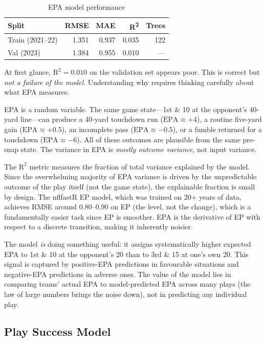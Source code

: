 \documentclass[11pt]{article}
\begin{document}
\begin{table}[H]
\centering
\caption{EPA model performance}
\begin{tabular}{lrrrr}
\toprule
Split & RMSE & MAE & R\textsuperscript{2} & Trees \\
\midrule
Train (2021--22) & 1.351 & 0.937 & 0.035 & 122 \\
Val (2023) & 1.384 & 0.955 & 0.010 & --- \\
\bottomrule
\end{tabular}
\end{table}

At first glance, $\text{R}^2 = 0.010$ on the validation set appears poor.
This is correct but \emph{not a failure of the model}. Understanding why
requires thinking carefully about what EPA measures.

EPA is a random variable. The same game state---1st \& 10 at the opponent's
40-yard line---can produce a 40-yard touchdown run ($\text{EPA} \approx +4$),
a routine five-yard gain ($\text{EPA} \approx +0.5$), an incomplete pass
($\text{EPA} \approx -0.5$), or a fumble returned for a touchdown
($\text{EPA} \approx -6$). All of these outcomes are plausible from the
same pre-snap state. The variance in EPA is \emph{mostly outcome variance},
not input variance.

The $\text{R}^2$ metric measures the fraction of total variance explained
by the model. Since the overwhelming majority of EPA variance is driven by
the unpredictable outcome of the play itself (not the game state), the
explainable fraction is small by design. The nflfastR EP model, which was
trained on 20+ years of data, achieves RMSE around $0.80$--$0.90$ on EP
(the level, not the change), which is a fundamentally easier task since EP
is smoother. EPA is the derivative of EP with respect to a discrete
transition, making it inherently noisier.

The model \emph{is} doing something useful: it assigns systematically
higher expected EPA to 1st \& 10 at the opponent's 20 than to 3rd \& 15
at one's own 20. This signal is captured by positive-EPA predictions in
favourable situations and negative-EPA predictions in adverse ones. The
value of the model lies in comparing teams' actual EPA to model-predicted
EPA across many plays (the law of large numbers brings the noise down),
not in predicting any individual play.

\subsection{Play Success Model}
\end{document}
